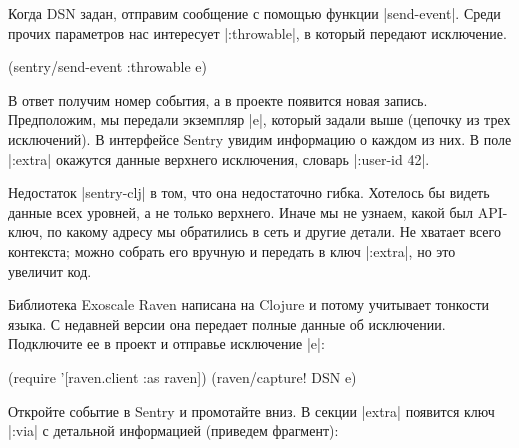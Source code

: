 Когда DSN задан, отправим сообщение с помощью функции \spverb|send-event|. Среди
прочих параметров нас интересует \spverb|:throwable|, в который передают
исключение.

\begin{english}
  \begin{clojure}
(sentry/send-event {:throwable e})
  \end{clojure}
\end{english}

В ответ получим номер события, а в проекте появится новая запись. Предположим,
мы передали экземпляр \spverb|e|, который задали выше (цепочку из трех
исключений). В интерфейсе Sentry увидим информацию о каждом из них. В поле
\spverb|:extra| окажутся данные верхнего исключения,
словарь \spverb|{:user-id 42}|.

Недостаток \spverb|sentry-clj| в том, что она недостаточно гибка. Хотелось бы
видеть данные всех уровней, а не только верхнего. Иначе мы не узнаем, какой был
API-ключ, по какому адресу мы обратились в сеть и другие детали. Не хватает
всего контекста; можно собрать его вручную и передать в ключ \spverb|:extra|, но
это увеличит код.

Библиотека Exoscale Raven написана на Clojure и потому учитывает тонкости
языка. С недавней версии она передает полные данные об исключении. Подключите ее
в проект и отправье исключение \spverb|e|:

\begin{english}
  \begin{clojure}

(require '[raven.client :as raven])
(raven/capture! DSN e)
  \end{clojure}
\end{english}

Откройте событие в Sentry и промотайте вниз. В секции \spverb|extra| появится
ключ \spverb|:via| с детальной информацией (приведем фрагмент):

\begin{english}
  \begin{json}
  \end{json}
\end{english}

